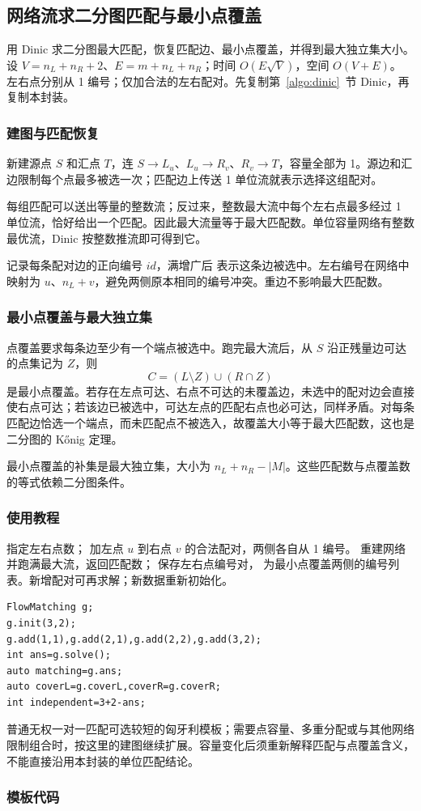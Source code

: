 \subsection{网络流求二分图匹配与最小点覆盖}
\label{algo:bipartite-flow}
\AlgorithmInfo
    {用 Dinic 求二分图最大匹配，恢复匹配边、最小点覆盖，并得到最大独立集大小。}
    {设 $V=n_L+n_R+2$、$E=m+n_L+n_R$；时间 $O(E\sqrt V)$，空间 $O(V+E)$。}
    {左右点分别从 1 编号；仅加合法的左右配对。先复制第~\ref{algo:dinic}~节 Dinic，再复制本封装。}

\subsubsection*{建图与匹配恢复}
新建源点 $S$ 和汇点 $T$，连 $S\to L_u$、$L_u\to R_v$、$R_v\to T$，容量全部为 1。源边和汇边限制每个点最多被选一次；匹配边上传送 1 单位流就表示选择这组配对。

每组匹配可以送出等量的整数流；反过来，整数最大流中每个左右点最多经过 1 单位流，恰好给出一个匹配。因此最大流量等于最大匹配数。单位容量网络有整数最优流，Dinic 按整数推流即可得到它。

记录每条配对边的正向编号 $id$，满增广后  表示这条边被选中。左右编号在网络中映射为 $u$、$n_L+v$，避免两侧原本相同的编号冲突。重边不影响最大匹配数。

\subsubsection*{最小点覆盖与最大独立集}
点覆盖要求每条边至少有一个端点被选中。跑完最大流后，从 $S$ 沿正残量边可达的点集记为 $Z$，则
\[
    C=(L\setminus Z)\cup(R\cap Z)
\]
是最小点覆盖。若存在左点可达、右点不可达的未覆盖边，未选中的配对边会直接使右点可达；若该边已被选中，可达左点的匹配右点也必可达，同样矛盾。对每条匹配边恰选一个端点，而未匹配点不被选入，故覆盖大小等于最大匹配数，这也是二分图的 K\H{o}nig 定理。

最小点覆盖的补集是最大独立集，大小为 $n_L+n_R-|M|$。这些匹配数与点覆盖数的等式依赖二分图条件。

\subsubsection*{使用教程}
 指定左右点数； 加左点 $u$ 到右点 $v$ 的合法配对，两侧各自从 1 编号。 重建网络并跑满最大流，返回匹配数； 保存左右点编号对， 为最小点覆盖两侧的编号列表。新增配对可再求解；新数据重新初始化。
\begin{lstlisting}[style=mtycpp,numbers=none]
FlowMatching g;
g.init(3,2);
g.add(1,1),g.add(2,1),g.add(2,2),g.add(3,2);
int ans=g.solve();
auto matching=g.ans;
auto coverL=g.coverL,coverR=g.coverR;
int independent=3+2-ans;
\end{lstlisting}
普通无权一对一匹配可选较短的匈牙利模板；需要点容量、多重分配或与其他网络限制组合时，按这里的建图继续扩展。容量变化后须重新解释匹配与点覆盖含义，不能直接沿用本封装的单位匹配结论。

\subsubsection*{模板代码}
